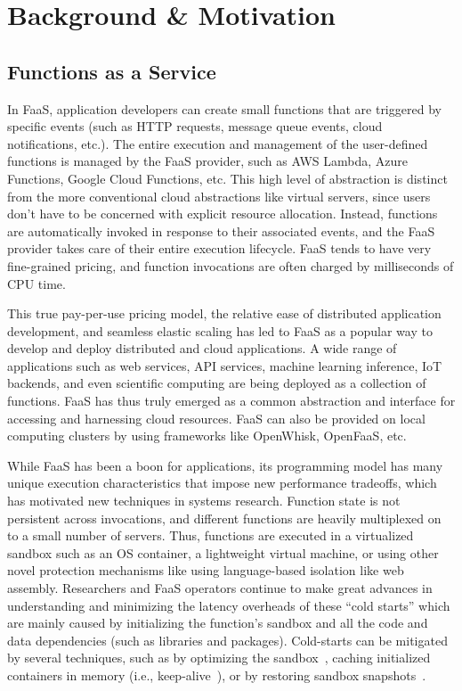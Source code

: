 \section{Background \& Motivation}

\subsection{Functions as a Service}

In FaaS, application developers can create small functions that are triggered by specific events (such as HTTP requests, message queue events, cloud notifications, etc.). 
The entire execution and management of the user-defined functions is managed by the FaaS provider, such as AWS Lambda, Azure Functions, Google Cloud Functions, etc.
This high level of abstraction is distinct from the more conventional cloud abstractions like virtual servers, since users don't have to be concerned with explicit resource allocation.
Instead, functions are automatically invoked in response to their associated events, and the FaaS provider takes care of their entire execution lifecycle.
FaaS tends to have very fine-grained pricing, and function invocations are often charged by milliseconds of CPU time.

This true pay-per-use pricing model, the relative ease of distributed application development, and seamless elastic scaling has led to FaaS as a popular way to develop and deploy distributed and cloud applications.
A wide range of applications such as web services, API services, machine learning inference, IoT backends, and even scientific computing are being deployed as a collection of functions.
FaaS has thus truly emerged as a common abstraction and interface for accessing and harnessing cloud resources.  
FaaS can also be provided on local computing clusters by using frameworks like OpenWhisk, OpenFaaS, etc. 

While FaaS has been a boon for applications, its programming model has many unique execution characteristics that impose new performance tradeoffs, which has motivated new techniques in systems research. 
Function state is not persistent across invocations, and different functions are heavily multiplexed on to a small number of servers. 
Thus, functions are executed in a virtualized sandbox such as an OS container, a lightweight virtual machine, or using other novel protection mechanisms like using language-based isolation like web assembly. 
Researchers and FaaS operators continue to make great advances in understanding and minimizing the latency overheads of these ``cold starts'' which are mainly caused by initializing the function's sandbox and all the code and data dependencies (such as libraries and packages).
Cold-starts can be mitigated by several techniques, such as by optimizing the sandbox~\cite{catalyzer}, caching initialized containers in memory (i.e., keep-alive~\cite{lin_mitigating_2019, faascache}), or by restoring sandbox snapshots~\cite{vhive, faassnap}.

